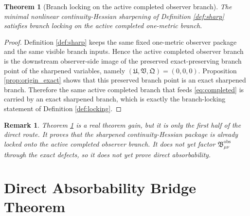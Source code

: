 \documentclass[11pt]{article}
\newcommand{\ObsBurden}{\mathfrak B_{\mu\nu}^{\mathrm{obs}}}
\newcommand{\RootTensor}{\mathfrak U}
\newcommand{\RootRelabel}{\mathfrak V}
\newcommand{\RootFree}{\mathfrak Q}
\newtheorem{remark}{Remark}
\newtheorem{theorem}{Theorem}
\begin{document}
\begin{theorem}[Branch locking on the active completed observer branch]
\label{thm:locking}
The minimal nonlinear continuity-Hessian sharpening of Definition \ref{def:sharp} satisfies branch locking on the active completed one-metric branch.
\end{theorem}

\begin{proof}
Definition \ref{def:sharp} keeps the same fixed one-metric observer package and the same visible branch inputs. Hence the active completed observer branch is the downstream observer-side image of the preserved exact-preserving branch point of the sharpened variables, namely \((\RootTensor,\RootRelabel,\RootFree)=(0,0,0)\). Proposition \ref{prop:origin_exact} shows that this preserved branch point is an exact sharpened branch. Therefore the same active completed branch that feeds \eqref{eq:completed} is carried by an exact sharpened branch, which is exactly the branch-locking statement of Definition \ref{def:locking}.
\end{proof}

\begin{remark}
Theorem \ref{thm:locking} is a real theorem gain, but it is only the first half of the direct route. It proves that the sharpened continuity-Hessian package is already locked onto the active completed observer branch. It does not yet factor \(\ObsBurden\) through the exact defects, so it does not yet prove direct absorbability.
\end{remark}

\section{Direct Absorbability Bridge Theorem}
\end{document}
